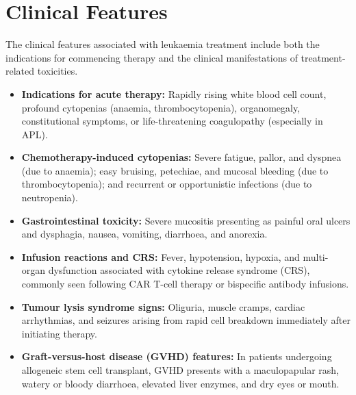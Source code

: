 \section*{Clinical Features}
The clinical features associated with leukaemia treatment include both the indications for commencing therapy and the clinical manifestations of treatment-related toxicities.
\begin{itemize}
    \item \textbf{Indications for acute therapy:} Rapidly rising white blood cell count, profound cytopenias (anaemia, thrombocytopenia), organomegaly, constitutional symptoms, or life-threatening coagulopathy (especially in APL).
    \item \textbf{Chemotherapy-induced cytopenias:} Severe fatigue, pallor, and dyspnea (due to anaemia); easy bruising, petechiae, and mucosal bleeding (due to thrombocytopenia); and recurrent or opportunistic infections (due to neutropenia).
    \item \textbf{Gastrointestinal toxicity:} Severe mucositis presenting as painful oral ulcers and dysphagia, nausea, vomiting, diarrhoea, and anorexia.
    \item \textbf{Infusion reactions and CRS:} Fever, hypotension, hypoxia, and multi-organ dysfunction associated with cytokine release syndrome (CRS), commonly seen following CAR T-cell therapy or bispecific antibody infusions.
    \item \textbf{Tumour lysis syndrome signs:} Oliguria, muscle cramps, cardiac arrhythmias, and seizures arising from rapid cell breakdown immediately after initiating therapy.
    \item \textbf{Graft-versus-host disease (GVHD) features:} In patients undergoing allogeneic stem cell transplant, GVHD presents with a maculopapular rash, watery or bloody diarrhoea, elevated liver enzymes, and dry eyes or mouth.
\end{itemize}

